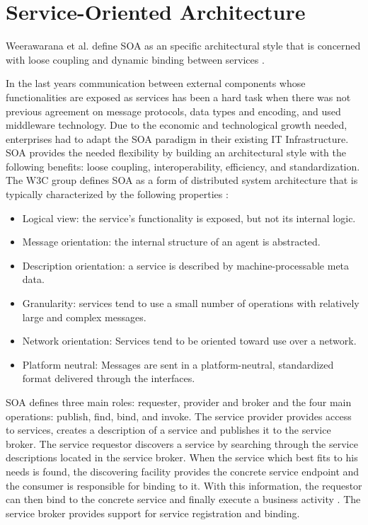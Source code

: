 \section{Service-Oriented Architecture}
\label{sec:soa}  

Weerawarana et al. define SOA as an specific architectural style that is concerned with loose coupling and dynamic binding between services \cite{Weera2005}.

In the last years communication between external components whose functionalities are exposed as services has been a hard task when there was not previous agreement on message protocols, data types and encoding, and used middleware technology. Due to the economic and technological growth needed, enterprises had to adapt the \ac{SOA} paradigm in their existing IT Infrastructure. \ac{SOA} provides the needed flexibility by building an architectural style with the following benefits: loose coupling, interoperability, efficiency, and standardization. The W3C group defines SOA as a form of distributed system architecture that is typically characterized by the following properties \cite{w3csoa}:
	\begin{itemize}
		\item Logical view: the service's functionality is exposed, but not its internal logic.
		\item Message orientation: the internal structure of an agent is abstracted.
		\item Description orientation: a service is described by machine-processable meta data.
		\item Granularity: services tend to use a small number of operations with relatively large and complex messages.
		\item Network orientation: Services tend to be oriented toward use over a network.
		\item Platform neutral: Messages are sent in a platform-neutral, standardized format delivered through the interfaces.
	\end{itemize}

\ac{SOA} defines three main roles: requester, provider and broker and the four main operations: publish, find, bind, and invoke. The service provider provides access to services, creates a description of a service and publishes it to the service broker. The service requestor discovers a service by searching through the service descriptions located in the service broker. When the service which best fits to his needs is found, the discovering facility provides the concrete service endpoint and the consumer is responsible for binding to it.  With this information, the requestor can then bind to the concrete service and finally execute a business activity \cite{Weera2005}. The service broker provides support for service registration and binding. 

